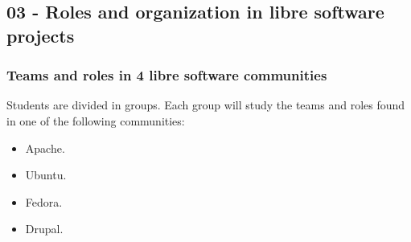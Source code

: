 \documentclass[a4paper]{article}
\begin{document}
% 
% 
% 
% 
% 
% 
\subsection{03 - Roles and organization in libre software projects}


\subsubsection{Teams and roles in 4 libre software communities}
\label{sub:roles-communities}

Students are divided in groups. Each group will study the teams and roles found 
in one of the following communities:

\begin{itemize}
 \item Apache.
 \item Ubuntu.
 \item Fedora.
 \item Drupal.
\end{itemize}
 
\end{document}
